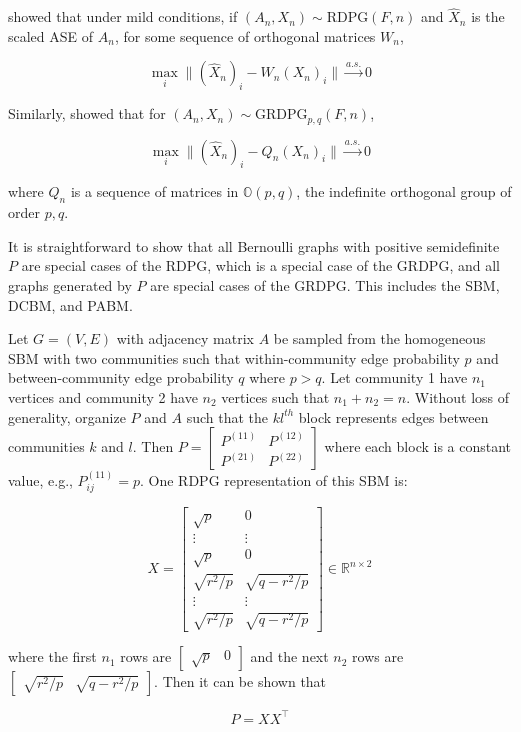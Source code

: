 \documentclass[
  11pt,
]{article}
\begin{document}
\citeauthor{athreya2017statistical} showed that under mild conditions,
if \((A_n, X_n) \sim \text{RDPG}(F, n)\) and \(\hat{X}_n\) is the scaled
ASE of \(A_n\), for some sequence of orthogonal matrices \(W_n\),

\begin{equation}
\max_i \|(\hat{X}_n)_i - W_n (X_n)_i \| \stackrel{a.s.}{\to} 0
\end{equation}

Similarly, \citet{rubindelanchy2017statistical} showed that for
\((A_n, X_n) \sim \text{GRDPG}_{p, q}(F, n)\),

\begin{equation}
\max_i \|(\hat{X}_n)_i - Q_n (X_n)_i \| \stackrel{a.s.}{\to} 0
\end{equation}

where \(Q_n\) is a sequence of matrices in \(\mathbb{O}(p, q)\), the
indefinite orthogonal group of order \(p, q\).

It is straightforward to show that all Bernoulli graphs with positive
semidefinite \(P\) are special cases of the RDPG, which is a special
case of the GRDPG, and all graphs generated by \(P\) are special cases
of the GRDPG. This includes the SBM, DCBM, and PABM.

\begin{example}
Let $G = (V, E)$ with adjacency matrix $A$ be sampled from the homogeneous SBM with two communities such that within-community edge probability $p$ and between-community edge probability $q$ where $p > q$. Let community 1 have $n_1$ vertices and community 2 have $n_2$ vertices such that $n_1 + n_2 = n$. Without loss of generality, organize $P$ and $A$ such that the $kl^{th}$ block represents edges between communities $k$ and $l$. Then $P = \begin{bmatrix} P^{(11)} & P^{(12)} \\ P^{(21)} & P^{(22)} \end{bmatrix}$ where each block is a constant value, e.g., $P^{(11)}_{ij} = p$. One RDPG representation of this SBM is:

$$X = \begin{bmatrix} 
\sqrt{p} & 0 \\
\vdots & \vdots \\
\sqrt{p} & 0 \\
\sqrt{r^2 / p} & \sqrt{q - r^2 / p} \\ 
\vdots & \vdots \\
\sqrt{r^2 / p} & \sqrt{q - r^2 / p}
\end{bmatrix}
\in \mathbb{R}^{n \times 2}$$

where the first $n_1$ rows are $\begin{bmatrix} \sqrt{p} & 0 \end{bmatrix}$ and the next $n_2$ rows are $\begin{bmatrix} \sqrt{r^2 / p} & \sqrt{q - r^2 / p} \end{bmatrix}$. Then it can be shown that 

$$P = X X^\top$$
\end{example}
\end{document}
